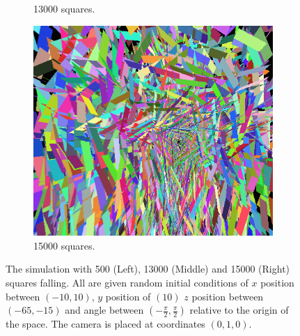 \begin{figure}[H]
\begin{subfigure}[b]{0.3\textwidth}
    	\caption{\label{fig:13000leaves}13000 squares.}
    \end{subfigure}
    \begin{subfigure}[b]{0.3\textwidth}
		\includegraphics[width=\textwidth]{Motion_Graphs/15000_leaves.png}
    	\caption{\label{fig:15000leaves}15000 squares.}
    \end{subfigure}
\caption{\label{fig:fallingleaves}The simulation with 500 (Left), 13000 (Middle) and 15000 (Right) squares falling. All are given random initial conditions of $x$ position between $(-10,10)$, $y$ position of $(10)$ $z$ position between $(-65,-15)$ and angle between $(-\frac{\pi}{2},\frac{\pi}{2})$ relative to the origin of the space. The camera is placed at coordinates $(0,1,0).$}
\end{figure}

